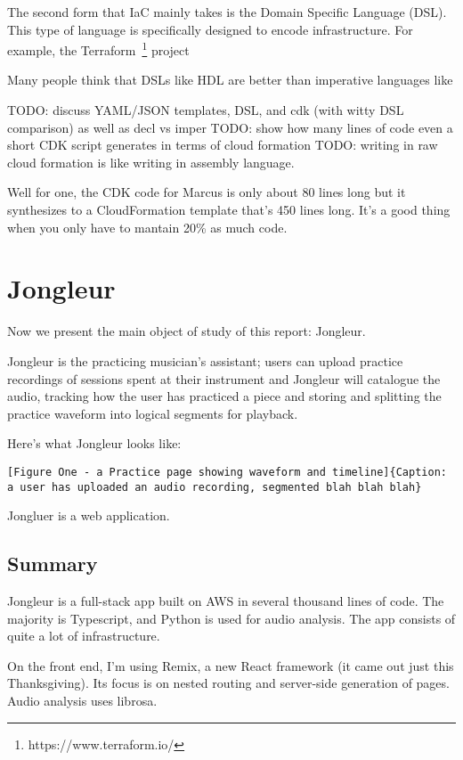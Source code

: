 \documentclass{article}
\begin{document}
The second form that IaC mainly takes is the Domain Specific Language (DSL).
This type of language is specifically designed to encode infrastructure.
For example, the Terraform~\footnote{https://www.terraform.io/} project 

Many people think that DSLs like HDL are better than imperative languages like 

TODO: discuss YAML/JSON templates, DSL, and cdk (with witty DSL comparison) as well as decl vs imper
TODO: show how many lines of code even a short CDK script generates in terms of cloud formation
TODO: writing in raw cloud formation is like writing in assembly language.

Well for one, the CDK code for Marcus is only about 80 lines long but it synthesizes to a CloudFormation template that's 450 lines long.
It's a good thing when you only have to mantain 20\% as much code.

\section{Jongleur}

Now we present the main object of study of this report: Jongleur.

Jongleur is the practicing musician's assistant; users can upload practice recordings of sessions spent at their instrument and Jongleur will catalogue the audio, tracking how the user has practiced a piece and storing and splitting the practice waveform into logical segments for playback.

Here's what Jongleur looks like:

\begin{verbatim}
[Figure One - a Practice page showing waveform and timeline]{Caption: a user has uploaded an audio recording, segmented blah blah blah}
\end{verbatim}

Jongluer is a web application.

\subsection{Summary}
Jongleur is a full-stack app built on AWS in several thousand lines of code.
The majority is Typescript, and Python is used for audio analysis.
The app consists of quite a lot of infrastructure.

On the front end, I'm using Remix, a new React framework (it came out just this Thanksgiving).
Its focus is on nested routing and server-side generation of pages.
Audio analysis uses librosa.
\end{document}
